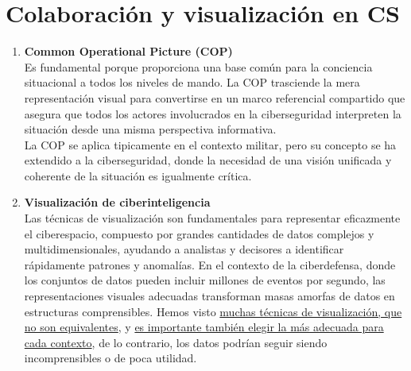 \section{Colaboración y visualización en CS}
\begin{enumerate}[resume]
\item \textbf{Common Operational Picture (COP)} \\
Es fundamental porque proporciona una base común para la conciencia situacional a todos los niveles de mando. 
La COP trasciende la mera representación visual para convertirse en un marco referencial compartido que asegura que todos los actores involucrados en la ciberseguridad interpreten la situación desde una misma perspectiva informativa.\\
La COP se aplica tipicamente en el contexto militar, pero su concepto se ha extendido a la ciberseguridad, donde la necesidad de una visión unificada y coherente de la situación es igualmente crítica.



\item \textbf{Visualización de ciberinteligencia} \\
Las técnicas de visualización son fundamentales para representar eficazmente el ciberespacio, compuesto por grandes cantidades de datos complejos y multidimensionales, ayudando a analistas y decisores a identificar rápidamente patrones y anomalías. En el contexto de la ciberdefensa, donde los conjuntos de datos pueden incluir millones de eventos por segundo, las representaciones visuales adecuadas transforman masas amorfas de datos en estructuras comprensibles.
Hemos visto \ul{muchas técnicas de visualización, que no son equivalentes}, y \ul{es importante también elegir la más adecuada para cada contexto}, de lo contrario, los datos podrían seguir siendo incomprensibles o de poca utilidad.


\end{enumerate}
